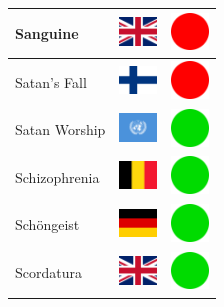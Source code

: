 \documentclass[12pt, a4paper, twoside]{report}
\begin{document}
\begin{center}
\begin{longtable}{|p{5cm}|p{2cm}|p{2cm}|}
			Sanguine & \includegraphics[width=1cm]{4x3/gb} & \includegraphics[width=1cm]{likes/n} \\ \hline
			Satan's Fall & \includegraphics[width=1cm]{4x3/fi} & \includegraphics[width=1cm]{likes/n} \\ \hline
			Satan Worship & \includegraphics[width=1cm]{4x3/un} & \includegraphics[width=1cm]{likes/y} \\ \hline
			Schizophrenia & \includegraphics[width=1cm]{4x3/be} & \includegraphics[width=1cm]{likes/y} \\ \hline
			Schöngeist & \includegraphics[width=1cm]{4x3/de} & \includegraphics[width=1cm]{likes/y} \\ \hline
			Scordatura & \includegraphics[width=1cm]{4x3/gb} & \includegraphics[width=1cm]{likes/y} \\ \hline

\end{longtable}
\end{center}
\end{document}

